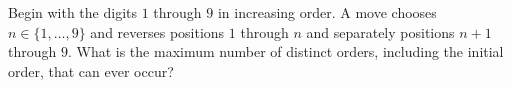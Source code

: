 Begin with the digits $1$ through $9$ in increasing order. A move chooses $n\in\{1,\ldots,9\}$ and reverses positions $1$ through $n$ and separately positions $n+1$ through $9$. What is the maximum number of distinct orders, including the initial order, that can ever occur?
